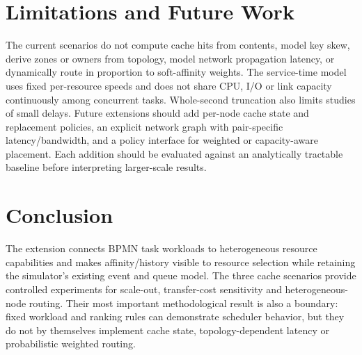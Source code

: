 \documentclass[conference]{IEEEtran}
\begin{document}
\section{Limitations and Future Work}

The current scenarios do not compute cache hits from contents, model key skew, derive zones or owners from topology,
model network propagation latency, or dynamically route in proportion to soft-affinity weights. The service-time model
uses fixed per-resource speeds and does not share CPU, I/O or link capacity continuously among concurrent tasks.
Whole-second truncation also limits studies of small delays. Future extensions should add per-node cache state and
replacement policies, an explicit network graph with pair-specific latency/bandwidth, and a policy interface for
weighted or capacity-aware placement. Each addition should be evaluated against an analytically tractable baseline
before interpreting larger-scale results.

\section{Conclusion}

The extension connects BPMN task workloads to heterogeneous resource capabilities and makes affinity/history visible
to resource selection while retaining the simulator's existing event and queue model. The three cache scenarios
provide controlled experiments for scale-out, transfer-cost sensitivity and heterogeneous-node routing. Their most
important methodological result is also a boundary: fixed workload and ranking rules can demonstrate scheduler
behavior, but they do not by themselves implement cache state, topology-dependent latency or probabilistic weighted
routing.
\end{document}
